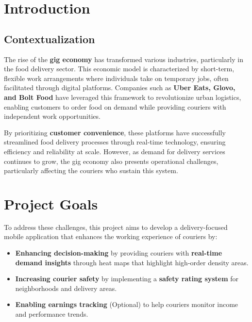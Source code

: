 \documentclass[a4paper,twoside,11pt]{article}
\begin{document}
{\sffamily
\section*{Introduction}

\vspace{5mm}

\subsection*{Contextualization}

\vspace{3mm}

The rise of the \textbf{gig economy} has transformed various industries, particularly in the food delivery sector. This economic model is characterized by short-term, flexible work arrangements where individuals take on temporary jobs, often facilitated through digital platforms. Companies such as \textbf{Uber Eats, Glovo, and Bolt Food} have leveraged this framework to revolutionize urban logistics, enabling customers to order food on demand while providing couriers with independent work opportunities.

\vspace{5mm}

By prioritizing \textbf{customer convenience}, these platforms have successfully streamlined food delivery processes through real-time technology, ensuring efficiency and reliability at scale. However, as demand for delivery services continues to grow, the gig economy also presents operational challenges, particularly affecting the couriers who sustain this system.

\section*{Project Goals}

To address these challenges, this project aims to develop a delivery-focused mobile application that enhances the working experience of couriers by:

\begin{itemize}
    \item \textbf{Enhancing decision-making} by providing couriers with \textbf{real-time demand insights} through heat maps that highlight high-order density areas.
    \item \textbf{Increasing courier safety} by implementing a \textbf{safety rating system} for neighborhoods and delivery areas.
    \item \textbf{Enabling earnings tracking} (Optional) to help couriers monitor income and performance trends.
\end{itemize}

}
\end{document}
